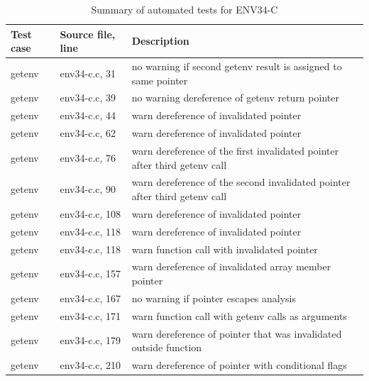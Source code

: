 \begin{table}[H]
	\centering
	\begin{tabular}{ | m{} | m{} | m{} |}
		\hline
		\textbf{Test case} & \textbf{Source file, line} & \textbf{Description} \\
		\hline \hline
		getenv & env34-c.c, 31 & no warning if second getenv result is assigned to same pointer\\
		\hline
		getenv & env34-c.c, 39 & no warning dereference of getenv return pointer\\
		\hline
		getenv & env34-c.c, 44 & warn dereference of invalidated pointer\\
		\hline
		getenv & env34-c.c, 62 & warn dereference of invalidated pointer\\
		\hline
		getenv & env34-c.c, 76 & warn dereference of the first invalidated pointer after third getenv call\\
		\hline
		getenv & env34-c.c, 90 & warn dereference of the second invalidated pointer after third getenv call\\
		\hline
		getenv & env34-c.c, 108 & warn dereference of invalidated pointer\\
		\hline
		getenv & env34-c.c, 118 & warn dereference of invalidated pointer\\
		\hline
		getenv & env34-c.c, 118 & warn function call with invalidated pointer\\
		\hline
		getenv & env34-c.c, 157 & warn dereference of invalidated array member pointer\\
		\hline
		getenv & env34-c.c, 167 & no warning if pointer escapes analysis\\
		\hline
		getenv & env34-c.c, 171 & warn function call with getenv calls as arguments\\
		\hline
		getenv & env34-c.c, 179 & warn dereference of pointer that was invalidated outside function\\
		\hline
		getenv & env34-c.c, 210 & warn dereference of pointer with conditional flags\\
		\hline
	\end{tabular}
	\caption{Summary of automated tests for ENV34-C}
	\label{tab:tests3}
\end{table}

